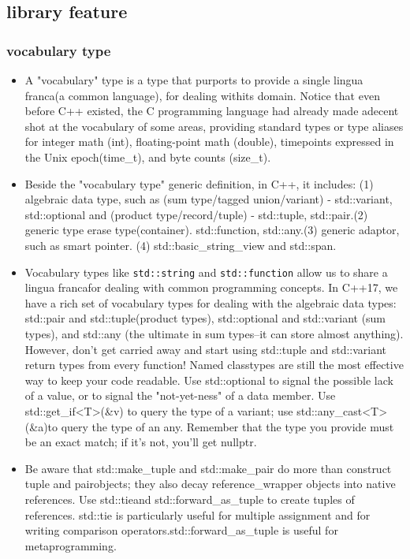\documentclass[a4paper,11pt,twoside]{book}
\begin{document}
\subsection{library feature}
\subsubsection{vocabulary type}
\begin{itemize}

    \item A "vocabulary" type is a type that purports to provide a single lingua franca(a common language), for dealing withits domain. Notice that even before C++ existed, the C programming language had already made adecent shot at the vocabulary of some areas, providing standard types or type aliases for integer math (int), floating-point math (double), timepoints expressed in the Unix epoch(time\_t), and byte counts (size\_t).

    \item Beside the "vocabulary type" generic definition, in C++, it includes: (1) algebraic data type, such as (sum type/tagged union/variant) - std::variant, std::optional and (product type/record/tuple) - std::tuple, std::pair.(2) generic type erase type(container). std::function, std::any.(3) generic adaptor, such as smart pointer. (4) std::basic\_string\_view and std::span.


    \item Vocabulary types like \texttt{std::string} and \texttt{std::function} allow us to share a lingua francafor dealing with common programming concepts. In C++17, we have a rich set of vocabulary types for dealing with the algebraic data types: std::pair and std::tuple(product types), std::optional and std::variant (sum types), and std::any (the ultimate in sum types--it can store almost anything). However, don't get carried away and start using std::tuple and std::variant return types from every function! Named classtypes are still the most effective way to keep your code readable. Use std::optional to signal the possible lack of a value, or to signal the "not-yet-ness" of a data member. Use std::get\_if<T>(\&v) to query the type of a variant; use std::any\_cast<T>(\&a)to query the type of an any. Remember that the type you provide must be an exact match; if it's not, you'll get nullptr.

    \item Be aware that std::make\_tuple and std::make\_pair do more than construct tuple and pairobjects; they also decay reference\_wrapper objects into native references. Use std::tieand std::forward\_as\_tuple to create tuples of references. std::tie is particularly useful for multiple assignment and for writing comparison operators.std::forward\_as\_tuple is useful for metaprogramming.


\end{itemize}
\end{document}
